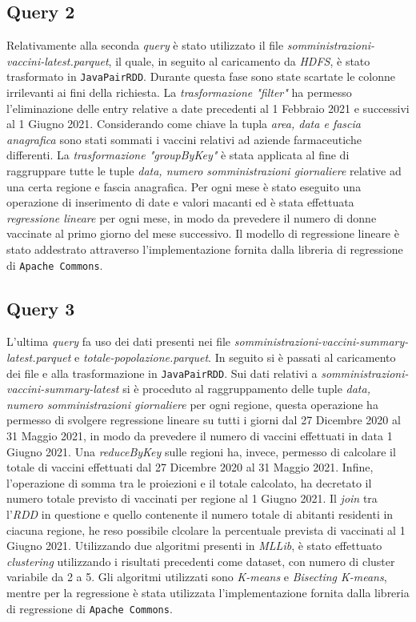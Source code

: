 \documentclass[conference]{IEEEtran}
\begin{document}
\subsection*{\textbf{Query 2}}
Relativamente alla seconda \emph{query} \`{e} stato utilizzato il file \textit{somministrazioni-vaccini-latest.parquet}, il quale, in seguito al caricamento da \emph{HDFS}, \`{e} stato trasformato in \texttt{JavaPairRDD}. Durante questa fase sono state scartate le colonne irrilevanti ai fini della richiesta. La \emph{trasformazione "filter"} ha permesso l'eliminazione delle entry relative a date precedenti al 1 Febbraio 2021 e successivi al 1 Giugno 2021. Considerando come chiave la tupla \emph{area, data e fascia anagrafica} sono stati sommati i vaccini relativi ad aziende farmaceutiche differenti. La \emph{trasformazione "groupByKey"} \`{e} stata applicata al fine di raggruppare tutte le tuple \emph{data, numero somministrazioni giornaliere} relative ad una certa regione e fascia anagrafica. Per ogni mese \`{e} stato eseguito una operazione di inserimento di date e valori macanti ed \`{e} stata effettuata \emph{regressione lineare} per ogni mese, in modo da prevedere il numero di donne vaccinate al primo giorno del mese successivo. Il modello di regressione lineare \`{e} stato addestrato attraverso l'implementazione fornita dalla libreria di regressione di \texttt{Apache Commons}.

\subsection*{\textbf{Query 3}}
L'ultima \emph{query} fa uso dei dati presenti nei file \textit{somministrazioni-vaccini-summary-latest.parquet} e \textit{totale-popolazione.parquet}. In seguito si \`{e} passati al caricamento dei file e alla trasformazione in \texttt{JavaPairRDD}. Sui dati relativi a \textit{somministrazioni-vaccini-summary-latest} si \`{e} proceduto al raggruppamento delle tuple \emph{data, numero somministrazioni giornaliere} per ogni regione, questa operazione ha permesso di svolgere regressione lineare su tutti i giorni dal 27 Dicembre 2020 al 31 Maggio 2021, in modo da prevedere il numero di vaccini effettuati in data 1 Giugno 2021. Una \emph{reduceByKey} sulle regioni ha, invece, permesso di calcolare il totale di vaccini effettuati dal 27 Dicembre 2020 al 31 Maggio 2021. Infine, l'operazione di somma tra le proiezioni e il totale calcolato, ha decretato il numero totale previsto di vaccinati per regione al 1 Giugno 2021. Il \emph{join} tra l'\emph{RDD} in questione e quello contenente il numero totale di abitanti residenti in ciacuna regione, he reso possibile clcolare la percentuale prevista di vaccinati al 1 Giugno 2021. Utilizzando due algoritmi presenti in \emph{MLLib}, \`{e} stato effettuato \emph{clustering} utilizzando i risultati precedenti come dataset, con numero di cluster variabile da 2 a 5. Gli algoritmi utilizzati sono \emph{K-means} e \emph{Bisecting K-means}, mentre per la regressione \`{e} stata utilizzata l'implementazione fornita dalla libreria di regressione di \texttt{Apache Commons}.
\end{document}
